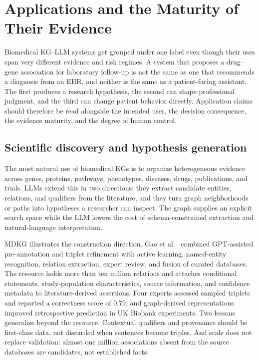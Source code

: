 \section{Applications and the Maturity of Their Evidence}

Biomedical KG--LLM systems get grouped under one label even though their uses span very different evidence and risk regimes. A system that proposes a drug--gene association for laboratory follow-up is not the same as one that recommends a diagnosis from an EHR, and neither is the same as a patient-facing assistant. The first produces a research hypothesis, the second can shape professional judgment, and the third can change patient behavior directly. Application claims should therefore be read alongside the intended user, the decision consequence, the evidence maturity, and the degree of human control.

\subsection{Scientific discovery and hypothesis generation}

The most natural use of biomedical KGs is to organize heterogeneous evidence across genes, proteins, pathways, phenotypes, diseases, drugs, publications, and trials. LLMs extend this in two directions: they extract candidate entities, relations, and qualifiers from the literature, and they turn graph neighborhoods or paths into hypotheses a researcher can inspect. The graph supplies an explicit search space while the LLM lowers the cost of schema-constrained extraction and natural-language interpretation.

MDKG illustrates the construction direction. Gao et al.~\cite{gao2025mdkg} combined GPT-assisted pre-annotation and triplet refinement with active learning, named-entity recognition, relation extraction, expert review, and fusion of curated databases. The resource holds more than ten million relations and attaches conditional statements, study-population characteristics, source information, and confidence metadata to literature-derived assertions. Four experts assessed sampled triplets and reported a correctness score of 0.79, and graph-derived representations improved retrospective prediction in UK Biobank experiments. Two lessons generalize beyond the resource. Contextual qualifiers and provenance should be first-class data, not discarded when sentences become triples. And scale does not replace validation: almost one million associations absent from the source databases are candidates, not established facts.

